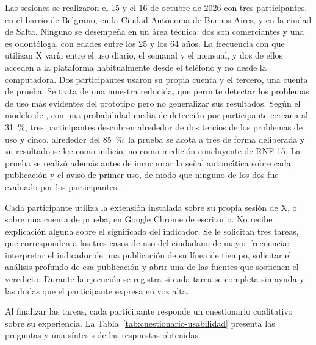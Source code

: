 Las sesiones se realizaron el 15 y el 16 de octubre de 2026 con tres participantes, en el barrio de Belgrano, en la Ciudad Autónoma de Buenos Aires, y en la ciudad de Salta. Ninguno se desempeña en un área técnica: dos son comerciantes y una es odontóloga, con edades entre los 25 y los 64 años. La frecuencia con que utilizan X varía entre el uso diario, el semanal y el mensual, y dos de ellos acceden a la plataforma habitualmente desde el teléfono y no desde la computadora. Dos participantes usaron su propia cuenta y el tercero, una cuenta de prueba. Se trata de una muestra reducida, que permite detectar los problemas de uso más evidentes del prototipo pero no generalizar sus resultados. Según el modelo de \textcite{NielsenLandauer1993}, con una probabilidad media de detección por participante cercana al 31~\%, tres participantes descubren alrededor de dos tercios de los problemas de uso y cinco, alrededor del 85~\%; la prueba se acota a tres de forma deliberada y su resultado se lee como indicio, no como medición concluyente de RNF-15. La prueba se realizó además antes de incorporar la señal automática sobre cada publicación y el aviso de primer uso, de modo que ninguno de los dos fue evaluado por los participantes.

Cada participante utiliza la extensión instalada sobre su propia sesión de X, o sobre una cuenta de prueba, en Google Chrome de escritorio. No recibe explicación alguna sobre el significado del indicador. Se le solicitan tres tareas, que corresponden a los tres casos de uso del ciudadano de mayor frecuencia: interpretar el indicador de una publicación de su línea de tiempo, solicitar el análisis profundo de esa publicación y abrir una de las fuentes que sostienen el veredicto. Durante la ejecución se registra si cada tarea se completa sin ayuda y las dudas que el participante expresa en voz alta.

Al finalizar las tareas, cada participante responde un cuestionario cualitativo sobre su experiencia. La Tabla~\ref{tab:cuestionario-usabilidad} presenta las preguntas y una síntesis de las respuestas obtenidas.

